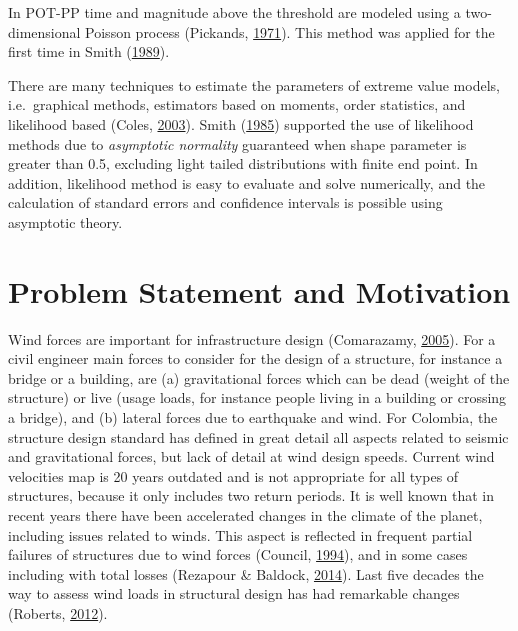 \documentclass[12pt,oneside]{reedthesis}
\begin{document}
In POT-PP time and magnitude above the threshold are modeled using a two-dimensional Poisson process (Pickands, \protect\hyperlink{ref-Pickands1971}{1971}). This method was applied for the first time in Smith (\protect\hyperlink{ref-Smith1989}{1989}).

There are many techniques to estimate the parameters of extreme value models, i.e.~graphical methods, estimators based on moments, order statistics, and likelihood based (Coles, \protect\hyperlink{ref-Coles2003}{2003}). Smith (\protect\hyperlink{ref-Smith1985}{1985}) supported the use of likelihood methods due to \emph{asymptotic normality} guaranteed when shape parameter is greater than 0.5, excluding light tailed distributions with finite end point. In addition, likelihood method is easy to evaluate and solve numerically, and the calculation of standard errors and confidence intervals is possible using asymptotic theory.

\hypertarget{problem-statement-and-motivation}{%
\section{Problem Statement and Motivation}\label{problem-statement-and-motivation}}

Wind forces are important for infrastructure design (Comarazamy, \protect\hyperlink{ref-windeffects}{2005}). For a civil engineer main forces to consider for the design of a structure, for instance a bridge or a building, are (a) gravitational forces which can be dead (weight of the structure) or live (usage loads, for instance people living in a building or crossing a bridge), and (b) lateral forces due to earthquake and wind. For Colombia, the structure design standard has defined in great detail all aspects related to seismic and gravitational forces, but lack of detail at wind design speeds. Current wind velocities map is 20 years outdated and is not appropriate for all types of structures, because it only includes two return periods.
It is well known that in recent years there have been accelerated changes in the climate of the planet, including issues related to winds. This aspect is reflected in frequent partial failures of structures due to wind forces (Council, \protect\hyperlink{ref-winddamage}{1994}), and in some cases including with total losses (Rezapour \& Baldock, \protect\hyperlink{ref-Rezapour2014}{2014}). Last five decades the way to assess wind loads in structural design has had remarkable changes (Roberts, \protect\hyperlink{ref-Roberts2012}{2012}).
\end{document}
